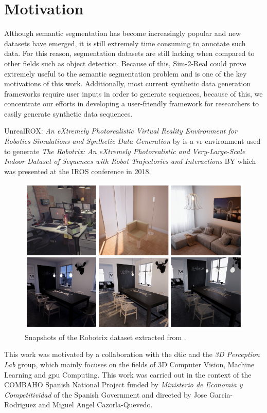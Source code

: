 \section{Motivation}
\label{sec:motivation}
Although semantic segmentation has become increasingly popular and new datasets have emerged, it is still extremely time consuming to annotate such data. For this reason, segmentation datasets are still lacking when compared to other fields such as object detection. Because of this, Sim-2-Real could prove extremely useful to the semantic segmentation problem and is one of the key motivations of this work. Additionally, most current synthetic data generation frameworks require user inputs in order to generate sequences, because of this, we concentrate our efforts in developing a user-friendly framework for researchers to easily generate synthetic data sequences.

UnrealROX: \textit{An eXtremely Photorealistic Virtual Reality Environment for Robotics Simulations and Synthetic Data Generation} by \cite{DBLP:journals/corr/abs-1810-06936} is a \gls{vr} environment used to generate \textit{The Robotrix: An eXtremely Photorealistic and Very-Large-Scale Indoor Dataset of Sequences with Robot Trajectories and Interactions} BY \cite{DBLP:journals/corr/abs-1901-06514} which was presented at the IROS conference in 2018.

\begin{figure}
	\centering
	\includegraphics[width=0.7\linewidth]{archivos/robotrix}
	\caption{Snapshots of the Robotrix dataset extracted from \cite{DBLP:journals/corr/abs-1901-06514}.}
	\label{fig:robotrix}
\end{figure}

This work was motivated by a collaboration with the \gls{dtic} and the \textit{3D Perception Lab} group, which mainly focuses on the fields of 3D Computer Vision, Machine Learning and \gls{gpu} Computing. This work was carried out in the context of the COMBAHO Spanish National Project funded by \textit{Ministerio de Economia y Competitividad} of the Spanish Government and directed by Jose Garcia-Rodriguez and Miguel Angel Cazorla-Quevedo.

